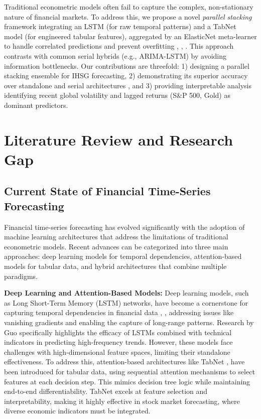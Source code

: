 \documentclass[conference]{IEEEtran}
\begin{document}
\par Traditional econometric models often fail to capture the complex, non-stationary nature of financial markets. To address this, we propose a novel \textit{parallel stacking} framework integrating an LSTM (for raw temporal patterns) and a TabNet model (for engineered tabular features), aggregated by an ElasticNet meta-learner to handle correlated predictions and prevent overfitting \cite{b2}, \cite{b3}, \cite{b4}. This approach contrasts with common serial hybrids (e.g., ARIMA-LSTM) by avoiding information bottlenecks. Our contributions are threefold: 1) designing a parallel stacking ensemble for IHSG forecasting, 2) demonstrating its superior accuracy over standalone and serial architectures \cite{b21}, and 3) providing interpretable analysis identifying recent global volatility and lagged returns (S\&P 500, Gold) as dominant predictors.

\section{Literature Review and Research Gap}

\subsection{Current State of Financial Time-Series Forecasting}
Financial time-series forecasting has evolved significantly with the adoption of machine learning architectures that address the limitations of traditional econometric models. Recent advances can be categorized into three main approaches: deep learning models for temporal dependencies, attention-based models for tabular data, and hybrid architectures that combine multiple paradigms.

\textbf{Deep Learning and Attention-Based Models:} Deep learning models, such as Long Short-Term Memory (LSTM) networks, have become a cornerstone for capturing temporal dependencies in financial data \cite{b3}, \cite{b20}, addressing issues like vanishing gradients and enabling the capture of long-range patterns. Research by Guo \cite{b17} specifically highlights the efficacy of LSTMs combined with technical indicators in predicting high-frequency trends. However, these models face challenges with high-dimensional feature spaces, limiting their standalone effectiveness. To address this, attention-based architectures like TabNet \cite{b7}, \cite{b11} have been introduced for tabular data, using sequential attention mechanisms to select features at each decision step. This mimics decision tree logic while maintaining end-to-end differentiability. TabNet excels at feature selection and interpretability, making it highly effective in stock market forecasting, where diverse economic indicators must be integrated.
\end{document}
